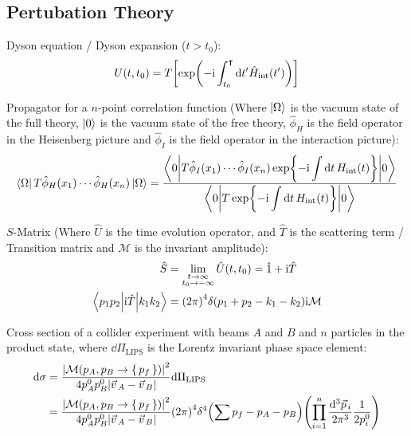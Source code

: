 	\subsection{Pertubation Theory}
		Dyson equation / Dyson expansion ($t > t_0$):
		\begin{equation}
			U(t,t_0) = T \qty[ \exp(-\mathrm{i} \int_{t_0}^\intercal \dd t' \hat{H}_{\mathrm{int}}(t')) ]
		\end{equation}

		\noindent
		Propagator for a $n$-point correlation function (Where $\Ket{\Omega}$ is the vacuum state of the full theory, $\Ket{0}$ is the vacuum state of the free theory, $\hat{\phi}_H$ is the field operator in the Heisenberg picture and $\hat{\phi}_I$ is the field operator in the interaction picture):
		\begin{equation}
			\Bra{\Omega} T \hat{\phi}_H(x_1) \dotsb \hat{\phi}_H(x_n) \Ket{\Omega}
			= \frac{ \mel**{0}{T \hat{\phi}_I(x_1) \dotsb \hat{\phi}_I(x_n) \exp{-\mathrm{i}\displaystyle\int \dd t \, H_{\mathrm{int}}(t)}}{0}}
			{\mel**{0}{T\exp{-\mathrm{i}\displaystyle\int \dd t \, H_{\mathrm{int}}(t)}}{0}}
		\end{equation}

		\noindent
		$S$-Matrix (Where $\hat{U}$ is the time evolution operator, and $\hat{T}$ is the scattering term / Transition matrix and $\mathcal{M}$ is the invariant amplitude):
		\begin{equation}
			\begin{aligned}
				\hat{S} &= \lim_{\substack{t \to\infty\\t_0 \to-\infty}} \hat{U}(t,t_0) = \hat{1} + \mathrm{i} \hat{T} \\
				\mel**{p_{1}p_{2}}{\mathrm{i} \hat{T}}{k_{1}k_{2}} &= \qty(2\pi)^4\delta(p_1 + p_2 - k_1 - k_2) \mathrm{i} \mathcal{M} \\
			\end{aligned}
		\end{equation}

		\noindent
		Cross section of a collider experiment with beams $A$ and $B$ and $n$ particles in the product state, where $\dd \Pi_\mathrm{LIPS}$ is the Lorentz invariant phase space element:
		\begin{equation}
			\begin{aligned}
				\dd \sigma
				&= \frac{\abs{\mathcal{M}(p_A,p_B \to\set{p_f})}^2}{4p_A^0 p_B^0 \abs{\vec{v}_A - \vec{v}_B}} \dd \Pi_\mathrm{LIPS} \\
				&= \frac{\abs{\mathcal{M}(p_A,p_B \to\set{p_f})}^2}{4p_A^0 p_B^0 \abs{\vec{v}_A - \vec{v}_B}}  \qty(2\pi)^4 \delta^4 \qty(\sum p_{f} - p_A - p_B) \qty(\prod_{i=1}^{n} \frac{\dd[3] \vec{p}_i}{2 \pi^3} \frac{1}{2 p_i^0})
			\end{aligned}
		\end{equation}

